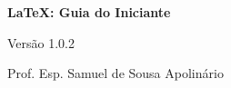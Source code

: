 

\begin{center}
	\vspace*{.3\textheight}
	
	{\Huge \color{blue}\textbf {\LaTeX: Guia do Iniciante}}
	
	\vspace*{1cm}
	
	Versão 1.0.2
	
	\vfill
	
	Prof. Esp. Samuel de Sousa Apolinário
	
\end{center}